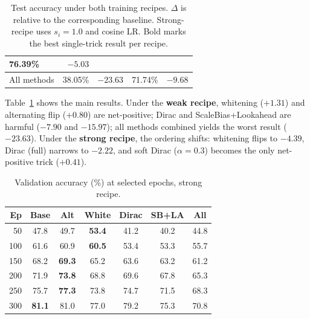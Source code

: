 \begin{table}[ht]
\begin{tabular}{lrrrr}
        76.39\%                                                &
        $-5.03$\pp{}
        \\
        \midrule
        All methods                                            &
        38.05\%                                                &
        $-23.63$\pp{}                                          &
        71.74\%                                                &
        $-9.68$\pp{}
        \\
        \bottomrule
    \end{tabular}
    \caption{Test accuracy under both training recipes. $\Delta$ is relative to the corresponding baseline.
    Strong-recipe \methodC{} uses $s_i{=}1.0$ and cosine LR.
    Bold marks the best single-trick result per recipe.}
    \label{tab:results}
\end{table}

Table~\ref{tab:results} shows the main results.
Under the \textbf{weak recipe}, whitening ($+1.31$\pp{}) and alternating flip ($+0.80$\pp{}) are net-positive; Dirac and ScaleBias+Lookahead are harmful ($-7.90$\pp{} and $-15.97$\pp{}); all methods combined yields the worst result ($-23.63$\pp{}).
Under the \textbf{strong recipe}, the ordering shifts: whitening flips to $-4.39$\pp{}, Dirac (full) narrows to $-2.22$\pp{}, and soft Dirac ($\alpha{=}0.3$) becomes the only net-positive trick ($+0.41$\pp{}).

\begin{table}[ht]
    \centering
    \setlength{\tabcolsep}{3pt}
    \small
    \begin{tabular}{rcccccc}
        \toprule
        Ep  & Base          & Alt           & White         & Dirac & SB+LA & All  \\
        \midrule
        50  & 47.8          & 49.7          & \textbf{53.4} & 41.2  & 40.2  & 44.8 \\
        100 & 61.6          & 60.9          & \textbf{60.5} & 53.4  & 53.3  & 55.7 \\
        150 & 68.2          & \textbf{69.3} & 65.2          & 63.6  & 63.2  & 61.2 \\
        200 & 71.9          & \textbf{73.8} & 68.8          & 69.6  & 67.8  & 65.3 \\
        250 & 75.7          & \textbf{77.3} & 73.8          & 74.7  & 71.5  & 68.3 \\
        300 & \textbf{81.1} & 81.0          & 77.0          & 79.2  & 75.3  & 70.8 \\
        \bottomrule
    \end{tabular}
    \caption{Validation accuracy (\%) at selected epochs, strong recipe.}
    \label{tab:epochs}
\end{table}


